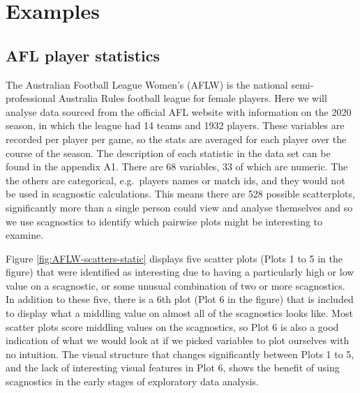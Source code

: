 \hypertarget{examples}{%
\section{Examples}\label{examples}}

\hypertarget{afl-player-statistics}{%
\subsection{AFL player statistics}\label{afl-player-statistics}}

The Australian Football League Women's (AFLW) is the national
semi-professional Australia Rules football league for female players.
Here we will analyse data sourced from the official AFL website with
information on the 2020 season, in which the league had 14 teams and
1932 players. These variables are recorded per player per game, so the
stats are averaged for each player over the course of the season. The
description of each statistic in the data set can be found in the
appendix A1. There are 68 variables, 33 of which are numeric. The the
others are categorical, e.g.~players names or match ids, and they would
not be used in scagnostic calculations. This means there are 528
possible scatterplots, significantly more than a single person could
view and analyse themselves and so we use scagnostics to identify which
pairwise plots might be interesting to examine.

Figure \ref{fig:AFLW-scatters-static} displays five scatter plots (Plots
1 to 5 in the figure) that were identified as interesting due to having
a particularly high or low value on a scagnostic, or some unusual
combination of two or more scagnostics. In addition to these five, there
is a 6th plot (Plot 6 in the figure) that is included to display what a
middling value on almost all of the scagnostics looks like. Most scatter
plots score middling values on the scagnostics, so Plot 6 is also a good
indication of what we would look at if we picked variables to plot
ourselves with no intuition. The visual structure that changes
significantly between Plots 1 to 5, and the lack of interesting visual
features in Plot 6, shows the benefit of using scagnostics in the early
stages of exploratory data analysis.

